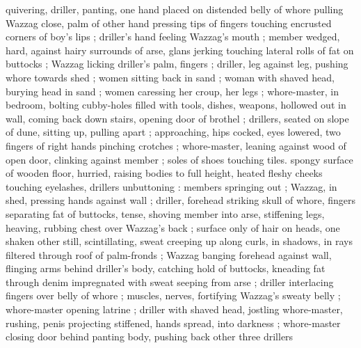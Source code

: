 quivering, driller, panting, one hand placed on distended belly of whore pulling Wazzag close, palm of other hand pressing tips of fingers touching encrusted corners of boy's lips ; driller's hand feeling Wazzag's mouth ; member wedged, hard, against hairy surrounds of arse, glans jerking touching lateral rolls of fat on buttocks ; Wazzag licking driller's palm, fingers ; driller, leg against leg, pushing whore towards shed ; women sitting back in sand ; woman with shaved head, burying head in sand ; women caressing her croup, her legs ; whore-master, in bedroom, bolting cubby-holes filled with tools, dishes, weapons, hollowed out in wall, coming back down stairs, opening door of brothel ; drillers, seated on slope of dune, sitting up, pulling apart ; approaching, hips cocked, eyes lowered, two fingers of right hands pinching crotches ; whore-master, leaning against wood of open door, clinking against member ; soles of shoes touching tiles. spongy surface of wooden floor, hurried, raising bodies to full height, heated fleshy cheeks touching eyelashes, drillers unbuttoning : members springing out ; Wazzag, in shed, pressing hands against wall ; driller, forehead striking skull of whore, fingers separating fat of buttocks, tense, shoving member into arse, stiffening legs, heaving, rubbing chest over Wazzag's back ; surface only of hair on heads, one shaken other still, scintillating, sweat creeping up along curls, in shadows, in rays filtered through roof of palm-fronds ; Wazzag banging forehead against wall, flinging arms behind driller's body, catching hold of buttocks, kneading fat through denim impregnated with sweat seeping from arse  ; driller interlacing fingers over belly of whore ; muscles, nerves, fortifying Wazzag's sweaty belly ; whore-master opening latrine ; driller with shaved head, jostling whore-master, rushing, penis projecting stiffened, hands spread, into darkness ; whore-master closing door behind panting body, pushing back other three drillers{\td} 
